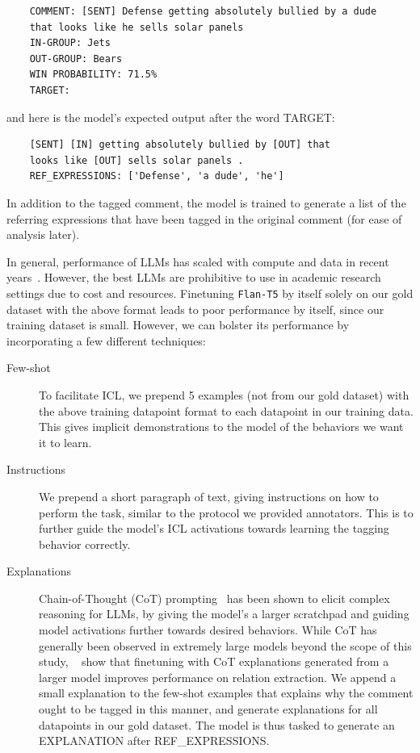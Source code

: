 \begin{verbatim}
    COMMENT: [SENT] Defense getting absolutely bullied by a dude
    that looks like he sells solar panels
    IN-GROUP: Jets
    OUT-GROUP: Bears
    WIN PROBABILITY: 71.5%
    TARGET:
\end{verbatim}

and here is the model's expected output after the word TARGET:

\begin{verbatim}
    [SENT] [IN] getting absolutely bullied by [OUT] that
    looks like [OUT] sells solar panels .
    REF_EXPRESSIONS: ['Defense', 'a dude', 'he']
\end{verbatim}

In addition to the tagged comment, the model is trained to generate a list of the referring expressions that have been tagged in the original comment (for ease of analysis later).

In general, performance of LLMs has scaled with compute and data in recent years~\citep{kaplan2020scaling}. However, the best LLMs are prohibitive to use in academic research settings due to cost and resources. Finetuning \texttt{Flan-T5} by itself solely on our gold dataset with the above format leads to poor performance by itself, since our training dataset is small. However, we can bolster its performance by incorporating a few different techniques: 

\begin{description}
    \item[Few-shot] To facilitate ICL, we prepend 5 examples (not from our gold dataset) with the above training datapoint format to each datapoint in our training data. This gives implicit demonstrations to the model of the behaviors we want it to learn.
    \item[Instructions] We prepend a short paragraph of text, giving instructions on how to perform the task, similar to the protocol we provided annotators. This is to further guide the model's ICL activations towards learning the tagging behavior correctly.
    \item[Explanations] Chain-of-Thought (CoT) prompting~\citep{NEURIPS2022_9d560961} has been shown to elicit complex reasoning for LLMs, by giving the model's a larger scratchpad and guiding model activations further towards desired behaviors. While CoT has generally been observed in extremely large models beyond the scope of this study, ~\citet{Wadhwa2023RevisitingRE} show that finetuning with CoT explanations generated from a larger model improves performance on relation extraction. We append a small explanation to the few-shot examples that explains why the comment ought to be tagged in this manner, and generate explanations for all datapoints in our gold dataset. The model is thus tasked to generate an EXPLANATION after REF\_EXPRESSIONS.
\end{description}

